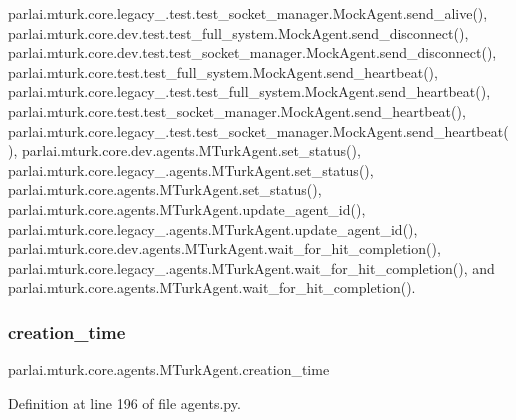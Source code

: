 parlai.\+mturk.\+core.\+legacy\+\_.\+test.\+test\+\_\+socket\+\_\+manager.\+Mock\+Agent.\+send\+\_\+alive(), parlai.\+mturk.\+core.\+dev.\+test.\+test\+\_\+full\+\_\+system.\+Mock\+Agent.\+send\+\_\+disconnect(), parlai.\+mturk.\+core.\+dev.\+test.\+test\+\_\+socket\+\_\+manager.\+Mock\+Agent.\+send\+\_\+disconnect(), parlai.\+mturk.\+core.\+test.\+test\+\_\+full\+\_\+system.\+Mock\+Agent.\+send\+\_\+heartbeat(), parlai.\+mturk.\+core.\+legacy\+\_.\+test.\+test\+\_\+full\+\_\+system.\+Mock\+Agent.\+send\+\_\+heartbeat(), parlai.\+mturk.\+core.\+test.\+test\+\_\+socket\+\_\+manager.\+Mock\+Agent.\+send\+\_\+heartbeat(), parlai.\+mturk.\+core.\+legacy\+\_.\+test.\+test\+\_\+socket\+\_\+manager.\+Mock\+Agent.\+send\+\_\+heartbeat(), parlai.\+mturk.\+core.\+dev.\+agents.\+M\+Turk\+Agent.\+set\+\_\+status(), parlai.\+mturk.\+core.\+legacy\+\_.\+agents.\+M\+Turk\+Agent.\+set\+\_\+status(), parlai.\+mturk.\+core.\+agents.\+M\+Turk\+Agent.\+set\+\_\+status(), parlai.\+mturk.\+core.\+agents.\+M\+Turk\+Agent.\+update\+\_\+agent\+\_\+id(), parlai.\+mturk.\+core.\+legacy\+\_.\+agents.\+M\+Turk\+Agent.\+update\+\_\+agent\+\_\+id(), parlai.\+mturk.\+core.\+dev.\+agents.\+M\+Turk\+Agent.\+wait\+\_\+for\+\_\+hit\+\_\+completion(), parlai.\+mturk.\+core.\+legacy\+\_.\+agents.\+M\+Turk\+Agent.\+wait\+\_\+for\+\_\+hit\+\_\+completion(), and parlai.\+mturk.\+core.\+agents.\+M\+Turk\+Agent.\+wait\+\_\+for\+\_\+hit\+\_\+completion().

\mbox{\label{classparlai_1_1mturk_1_1core_1_1agents_1_1MTurkAgent_aebcc59e3917d5227522e745503f2e813}} 
\subsubsection{\texorpdfstring{creation\+\_\+time}{creation\_time}}
{\footnotesize\ttfamily parlai.\+mturk.\+core.\+agents.\+M\+Turk\+Agent.\+creation\+\_\+time}



Definition at line 196 of file agents.\+py.

\mbox{\label{classparlai_1_1mturk_1_1core_1_1agents_1_1MTurkAgent_ae5f9e297a7b8cc7f70286dfbb099ed64}} 
